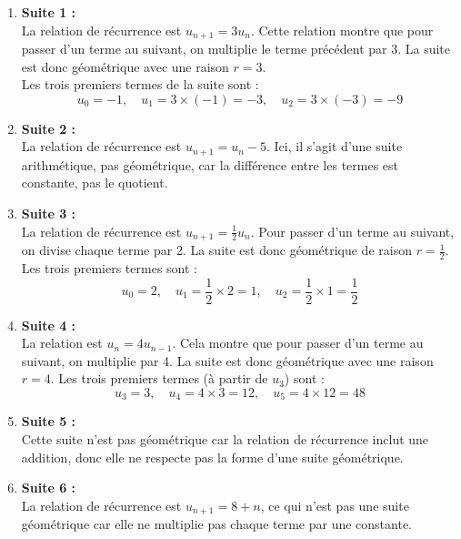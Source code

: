 \documentclass[a4paper,12pt]{article}
\begin{document}
        \begin{enumerate}
            \item \textbf{Suite 1 :} \\
            La relation de récurrence est $u_{n+1} = 3u_n$. Cette relation montre que pour passer d’un terme au suivant, on multiplie le terme précédent par 3. La suite est donc géométrique avec une raison $r = 3$. \\
            Les trois premiers termes de la suite sont :
            \[
            u_0 = -1, \quad u_1 = 3 \times (-1) = -3, \quad u_2 = 3 \times (-3) = -9
            \]
            \item \textbf{Suite 2 :} \\
            La relation de récurrence est $u_{n+1} = u_n - 5$. Ici, il s'agit d'une suite arithmétique, pas géométrique, car la différence entre les termes est constante, pas le quotient.
            \item \textbf{Suite 3 :} \\
            La relation de récurrence est $u_{n+1} = \frac{1}{2} u_n$. Pour passer d’un terme au suivant, on divise chaque terme par 2. La suite est donc géométrique de raison $r = \frac{1}{2}$. \\
            Les trois premiers termes sont :
            \[
            u_0 = 2, \quad u_1 = \frac{1}{2} \times 2 = 1, \quad u_2 = \frac{1}{2} \times 1 = \frac{1}{2}
            \]
            \item \textbf{Suite 4 :} \\
            La relation est $u_n = 4u_{n-1}$. Cela montre que pour passer d’un terme au suivant, on multiplie par 4. La suite est donc géométrique avec une raison $r = 4$. Les trois premiers termes (à partir de $u_3$) sont :
            \[
            u_3 = 3, \quad u_4 = 4 \times 3 = 12, \quad u_5 = 4 \times 12 = 48
            \]
            \item \textbf{Suite 5 :} \\
            Cette suite n'est pas géométrique car la relation de récurrence inclut une addition, donc elle ne respecte pas la forme d'une suite géométrique.
            \item \textbf{Suite 6 :} \\
            La relation de récurrence est $u_{n+1} = 8 + n$, ce qui n’est pas une suite géométrique car elle ne multiplie pas chaque terme par une constante.
        \end{enumerate}
        
        \bigskip
        
\end{document}
